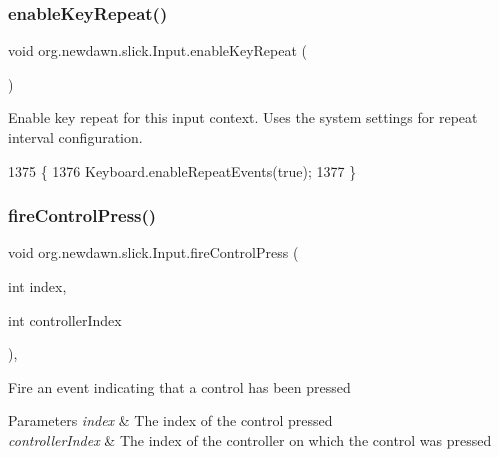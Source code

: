 \subsubsection{\texorpdfstring{enable\+Key\+Repeat()}{enableKeyRepeat()}\hspace{0.1cm}{\footnotesize\ttfamily [2/2]}}
{\footnotesize\ttfamily void org.\+newdawn.\+slick.\+Input.\+enable\+Key\+Repeat (\begin{DoxyParamCaption}{ }\end{DoxyParamCaption})\hspace{0.3cm}{\ttfamily [inline]}}

Enable key repeat for this input context. Uses the system settings for repeat interval configuration. 
\begin{DoxyCode}
1375                                   \{
1376         Keyboard.enableRepeatEvents(\textcolor{keyword}{true});
1377     \}
\end{DoxyCode}
\mbox{\label{classorg_1_1newdawn_1_1slick_1_1_input_a2ea0ce0e12309c09547e6ed869151506}} 
\subsubsection{\texorpdfstring{fire\+Control\+Press()}{fireControlPress()}}
{\footnotesize\ttfamily void org.\+newdawn.\+slick.\+Input.\+fire\+Control\+Press (\begin{DoxyParamCaption}\item[{int}]{index,  }\item[{int}]{controller\+Index }\end{DoxyParamCaption})\hspace{0.3cm}{\ttfamily [inline]}, {\ttfamily [private]}}

Fire an event indicating that a control has been pressed


\begin{DoxyParams}{Parameters}
{\em index} & The index of the control pressed \\
\hline
{\em controller\+Index} & The index of the controller on which the control was pressed \\
\hline
\end{DoxyParams}

